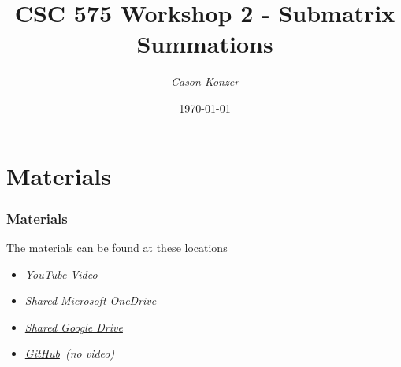 \documentclass{beamer}
\title[Workshop 1]{CSC 575 Workshop 2 - Submatrix Summations}
\author{\XV\textit{\large{\href{https://github.com/casonk}{Cason Konzer}}}\XB}
\institute[UM FLINT]{\normalsize{\textit{\href{mailto:casonk@umich.edu}{casonk@umich.edu}}}}
\date[]{\today}
\newcommand{\XB}{\color{black}}
\newcommand{\XV}{\color{violet}}
\begin{document}
\begin{frame}
    \titlepage
\end{frame}




\section{Materials}

\begin{frame}

    \frametitle{Materials}

    The materials can be found at these locations 

    \vspace{2.5mm}
    \begin{itemize}
        \item \XV\textit{\large{\href{https://youtu.be/YxmtxU44CrM}{YouTube Video}}}\XB
        \item \XV\textit{\large{\href{https://umich-my.sharepoint.com/:f:/g/personal/casonk_umich_edu/Eluov0GBscpHpKC6SwS1vQcBpai93NMa307rb038YKU0uA?e=bbhSqh}{Shared Microsoft OneDrive}}}\XB
        \item \XV\textit{\large{\href{https://drive.google.com/drive/folders/1dVEr45BidZYurfp4pKB_3_CDkN-xm0qa?usp=sharing}{Shared Google Drive}}}\XB
        \item \XV\textit{\large{\href{https://github.com/casonk/CSC575-Algorithm_and_Complexity_Analysis/tree/main/WorkShop/WorkShop2}{GitHub}}}\XB \ \emph{(no video)}
    \end{itemize}

\end{frame}
\end{document}

